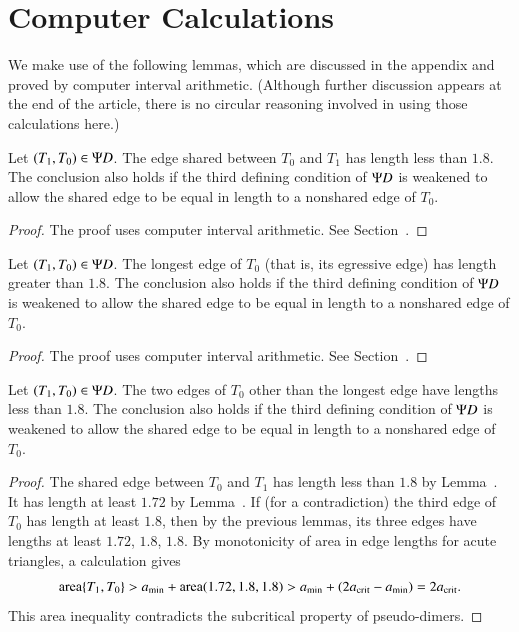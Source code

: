 \section{Computer Calculations}

We make use of the following lemmas, which are discussed in the
appendix and proved by computer interval arithmetic.  (Although
further discussion appears at the end of the article, there is no
circular reasoning involved in using those calculations here.)

\begin{lemma}  
Let $(T_1,T_0)\in \Psi D$.  The edge shared between
$T_0$ and $T_1$ has length less than $1.8$.
  The conclusion also holds if the third defining condition of $\Psi D$ is
  weakened to allow the shared edge to be equal in length to a nonshared edge
  of $T_0$.
\end{lemma}

\begin{proof} The proof uses computer interval arithmetic. See Section~.
\end{proof}

\begin{lemma} 
  Let $(T_1,T_0)\in \Psi D$.  The longest edge of $T_0$ (that is, its
  egressive edge) has length greater than $1.8$.
  The conclusion also holds if the third defining condition of $\Psi D$ is
  weakened to allow the shared edge to be equal in length to a nonshared edge
  of $T_0$.
\end{lemma}

\begin{proof} The proof uses computer interval arithmetic. See Section~.
\end{proof}

\begin{lemma}  
  Let $(T_1,T_0)\in \Psi D$.  The two edges of $T_0$ other than the
  longest edge have lengths less than $1.8$.
  The conclusion also holds if the third defining condition of $\Psi D$ is
  weakened to allow the shared edge to be equal in length to a nonshared edge
  of $T_0$.
\end{lemma}

\begin{proof}
  The shared edge between $T_0$ and $T_1$ has length less than $1.8$
  by Lemma~.  It has length at least $1.72$ by
  Lemma~.  If (for a contradiction) the third edge of
  $T_0$ has length at least $1.8$, then by the previous lemmas, its
  three edges have lengths at least $1.72$, $1.8$, $1.8$.  
By monotonicity of area in edge lengths for acute triangles, a calculation gives
\[
{\operatorname{area}}\{T_1,T_0\} > a_\text{min} + {\operatorname{area}}(1.72,1.8,1.8) 
> a_\text{min} + (2a_\text{crit} -a_\text{min}) = 2a_\text{crit}.
\]
This area inequality contradicts the subcritical property of pseudo-dimers.
\end{proof}

